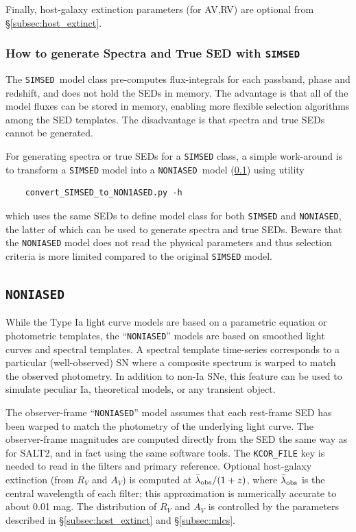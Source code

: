 \documentclass[12pt]{article}
\newcommand{\SIMSED}{{\tt SIMSED}}
\newcommand{\NONIA}{{\tt NONIASED}}
\newcommand{\lamobs}{\lambda_{\rm obs}}
\begin{document}
Finally, host-galaxy extinction parameters (for AV,RV) 
are optional from \S\ref{subsec:host_extinct}.

\subsubsection{How to generate Spectra and True SED with {\SIMSED} }
\label{sss:SIMSED_Spectra}

The \SIMSED\ model class pre-computes flux-integrals for each passband, phase and redshift,
and does not hold the SEDs in memory. The advantage is that all of the model fluxes can be
stored in memory, enabling more flexible selection algorithms among the SED templates.
The disadvantage is that spectra and true SEDs cannot be generated.

For generating spectra or true SEDs for a {\tt SIMSED} class, a simple work-around is
to transform a {\tt SIMSED} model into a \NONIA\ model (\ref{subsec:NON1A})
using utility
\begin{verbatim}
    convert_SIMSED_to_NON1ASED.py -h
\end{verbatim}
which uses the same SEDs to define model class for both {\tt SIMSED} and {\NONIA},
the latter of which can be used to generate spectra and true SEDs.
Beware that the {\NONIA} model does not read the physical parameters and thus
selection criteria is more limited compared to the original {\tt SIMSED} model.

\clearpage
\subsection{\NONIA}
\label{subsec:NON1A}

While the Type Ia light curve models are based on
a parametric equation or photometric templates, 
the ``{\NONIA}'' models are based on smoothed 
light curves and spectral templates.  
A spectral template time-series corresponds to a particular (well-observed)
SN where a composite spectrum is warped to match
the observed photometry.
In addition to non-Ia SNe, this feature can be used to
simulate peculiar Ia, theoretical models, or any transient object.


The observer-frame ``{\NONIA}'' model assumes that each
rest-frame SED has been warped to match the photometry of the
underlying light curve. The observer-frame magnitudes are
computed directly from the SED the same way as for SALT2,
and in fact using the same software tools.
The {\tt KCOR\_FILE} key is needed 
to read in the filters and primary reference. 
Optional host-galaxy extinction (from $R_V$ and $A_V$) is computed at 
$\bar\lamobs/(1+z)$, where $\bar\lamobs$ is the central wavelength 
of each filter;
this approximation is numerically accurate to about 0.01 mag.
The distribution of $R_V$ and $A_V$ is controlled by the
parameters described in \S\ref{subsec:host_extinct} and \S\ref{subsec:mlcs}.
\end{document}
